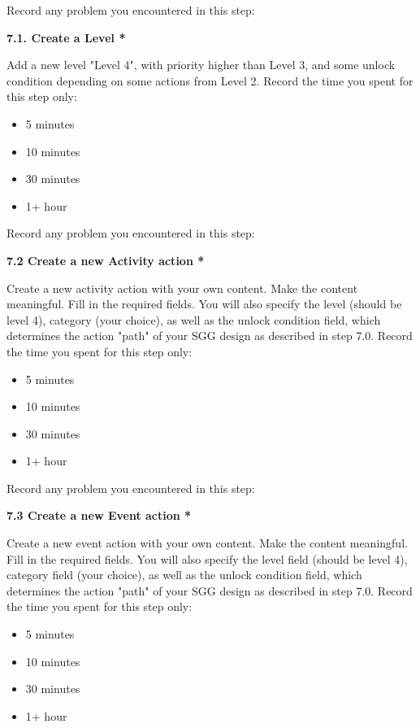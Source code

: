 Record any problem you encountered in this step:

{\bf 7.1. Create a Level *}

Add a new level "Level 4", with priority higher than Level 3, and some unlock condition depending on some actions from Level 2. Record the time you spent for this step only:

\begin{itemize}
\item 5 minutes
\item  10 minutes
\item  30 minutes
\item  1+ hour
\end{itemize}


Record any problem you encountered in this step:

{\bf 7.2 Create a new Activity action *}

Create a new activity action with your own content. Make the content meaningful. Fill in the required fields. You will also specify the level (should be level 4), category (your choice), as well as the unlock condition field, which determines the action "path" of your SGG design as described in step 7.0. Record the time you spent for this step only:

\begin{itemize}
\item 5 minutes
\item  10 minutes
\item  30 minutes
\item  1+ hour
\end{itemize}


Record any problem you encountered in this step:

{\bf 7.3 Create a new Event action *}

Create a new event action with your own content. Make the content meaningful. Fill in the required fields. You will also specify the level field (should be level 4), category field (your choice), as well as the unlock condition field, which determines the action "path" of your SGG design as described in step 7.0. Record the time you spent for this step only:

\begin{itemize}
\item 5 minutes
\item  10 minutes
\item  30 minutes
\item  1+ hour
\end{itemize}


